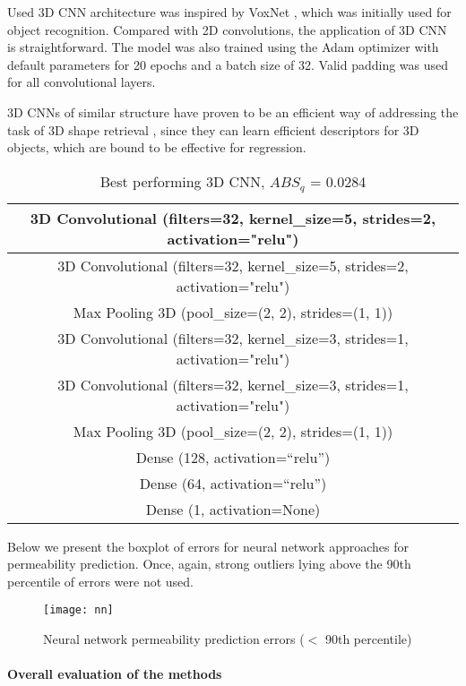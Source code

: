 \documentclass[review]{elsarticle}
\begin{document}
Used 3D CNN architecture was inspired by VoxNet \cite{maturana2015voxnet}, which was initially used for object recognition. Compared with 2D convolutions, the application of 3D CNN is straightforward. The model was also trained using the Adam optimizer with default parameters for 20 epochs and a batch size of 32. Valid padding was used for all convolutional layers.

3D CNNs of similar structure have proven to be an efficient way of addressing the task of 3D shape retrieval \cite{notchenko2017large}, since they can learn efficient descriptors for 3D objects, which are bound to be effective for regression.

\begin{table}[H]
  \centering
  \caption{Best performing 3D CNN, $ABS_q$ = 0.0284} \label{tab:tab8}
  \begin{tabular}{ | c |}
    \hline
    3D Convolutional (filters=32, kernel\_size=5, strides=2, activation="relu") \\ \hline
    3D Convolutional (filters=32, kernel\_size=5, strides=2, activation="relu") \\ \hline
    Max Pooling 3D (pool\_size=(2, 2), strides=(1, 1)) \\ \hline
    3D Convolutional (filters=32, kernel\_size=3, strides=1, activation="relu") \\ \hline
    3D Convolutional (filters=32, kernel\_size=3, strides=1, activation="relu") \\ \hline
    Max Pooling 3D (pool\_size=(2, 2), strides=(1, 1)) \\ \hline
    Dense (128, activation=“relu”) \\ \hline
    Dense (64, activation=“relu”) \\ \hline
    Dense (1, activation=None) \\ \hline
  \end{tabular}
\end{table}

Below we present the boxplot of errors for neural network approaches for permeability prediction. Once, again, strong outliers lying above the 90th percentile of errors were not used.

\begin{figure}[H]
    \centering
  \texttt{[image: nn]}
    \caption{Neural network permeability prediction errors ($<$ 90th percentile)}
\end{figure}

\paragraph{Overall evaluation of the methods}
\end{document}

